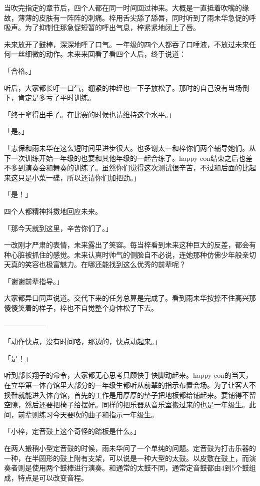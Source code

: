 \documentclass[UTF8]{ctexart}
\begin{document}
    当吹完指定的章节后，四个人都在同一时间回过神来。大概是一直抵着吹嘴的缘故，薄薄的皮肤有一阵阵的刺痛。梓用舌尖舔了舔唇，同时听到了雨未华急促的呼吸声。为了抑制住那急促短暂的呼出气息，梓紧紧地闭上了唇。

    未来放开了鼓棒，深深地呼了口气。一年级的四个人都吞了口唾液，不放过未来任何一丝细微的动作。未来来回看了看四个人后，终于说道：

    「合格。」

    听后，大家都长吁一口气，绷紧的神经也一下子放松了。那时的自己没有当场倒下，肯定是多亏了平时训练。

    「终于拿得出手了。在比赛的时候也请维持这个水平。」

    「是。」

    「志保和雨未华在这么短时间里进步很大。也多谢太一和梓你们两个辅导她们。从下一次训练开始一年级的也要和其他年级的一起合练了。happy con结束之后也差不多到演奏会和舞奏的训练了。虽然你们觉得这次测试很辛苦，不过和后面的比起来这只是小菜一碟，所以还请你们加把劲。」

    「是！」

    四个人都精神抖擞地回应未来。

    「那今天就到这里，辛苦你们了。」

    一改刚才严肃的表情，未来露出了笑容。每当梓看到未来这种巨大的反差，都会有种心脏被抓住的感觉。未来认真时帅气的侧脸自不必说，连她那种仿佛少年般亲切天真的笑容也极富魅力。在哪还能找到这么优秀的前辈呢？

    「谢谢前辈指导。」

    大家都异口同声说道。交代下来的任务总算是完成了。看到雨未华按捺不住高兴那傻傻笑着的样子，梓也不自觉整个身体松了下去。

    ——————

    「动作快点，没有时间咯，那边的，快点动起来。」

    「是！」

    听到部长翔子的命令，大家都无心思考只顾快手快脚动起来。happy con的当天，在立华第一体育馆里大部分的一年级生都听从前辈的指示布置会场。为了让客人不换鞋就能进入体育馆，首先的工作是用厚厚的垫子把地板都给铺起来。要铺得不留空隙，然后还要把椅子给摆好。同样的把乐器从音乐室搬过来的也是一年级生。此间，前辈则练习今天要吹的曲子和指示一年级生。

    「小梓，定音鼓上这个奇怪的踏板是什么。」

    在两人搬稍小型定音鼓的时候，雨未华问了一个单纯的问题。定音鼓为打击乐器的一种，在半圆形的鼓上附有支架，可以说是一种大型的太鼓。以皮敷在鼓上，而演奏者则是使用两个鼓棒进行演奏。和通常的太鼓不同，通常定音鼓都由4到5个鼓组成，特点是可以改变音程。
\end{document}
